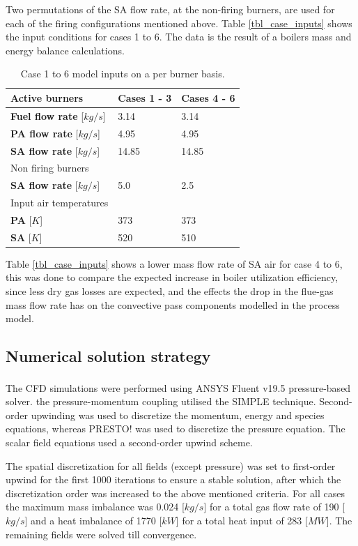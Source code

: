 \documentclass[review]{elsarticle}
\begin{document}
Two permutations of the SA flow rate, at the non-firing burners, are used for each of the firing configurations mentioned above. Table \ref{tbl_case_inputs} shows the input conditions for cases 1 to 6. The data is the result of a boilers mass and energy balance calculations.

\begin{table}[h!]
\centering
\caption{Case 1 to 6 model inputs on a per burner basis.}
\label{tbl_case_inputs}
\vspace{5mm}
\label{fuel}
{\tabulinesep=1.2mm
\begin{tabularx}{\textwidth}{p{} p{} l}
\hline
Active burners & \textbf{Cases 1 - 3} & \textbf{Cases 4 - 6}\\
\hline
\textbf{Fuel flow rate} [$kg/s$]&3.14  &3.14\\
\textbf{PA flow rate} [$kg/s$]&4.95  &4.95\\
\textbf{SA flow rate} [$kg/s$]&14.85  &14.85\\
\hline
Non firing burners &  & \\
\hline
\textbf{SA flow rate} [$kg/s$]&5.0  &2.5\\
\hline
Input air temperatures& &\\
\hline
\textbf{PA} [$K$]&373  &373\\
\textbf{SA} [$K$]&520  &510\\
\hline
\end{tabularx}}
\end{table}

Table \ref{tbl_case_inputs} shows a lower mass flow rate of SA air for case 4 to 6, this was done to compare the expected increase in boiler utilization efficiency, since less dry gas losses are expected, and the effects the drop in the flue-gas mass flow rate has on the convective pass components modelled in the process model. 

\subsection{Numerical solution strategy} 
The CFD simulations were performed using ANSYS Fluent v19.5\textsuperscript{\textregistered} pressure-based solver. the pressure-momentum coupling utilised the SIMPLE technique. Second-order upwinding was used to discretize the momentum, energy and species equations, whereas PRESTO! was used to discretize the pressure equation. The scalar field equations used a second-order upwind scheme.

The spatial discretization for all fields (except pressure) was set to first-order upwind for the first 1000 iterations to ensure a stable solution, after which the discretization order was increased to the above mentioned criteria. For all cases the maximum mass imbalance was 0.024 [$kg/s$] for a total gas flow rate of 190 [$kg/s$] and a heat imbalance of 1770 [$kW$] for a total heat input of 283 [$MW$]. The remaining fields were solved till convergence.
\end{document}

